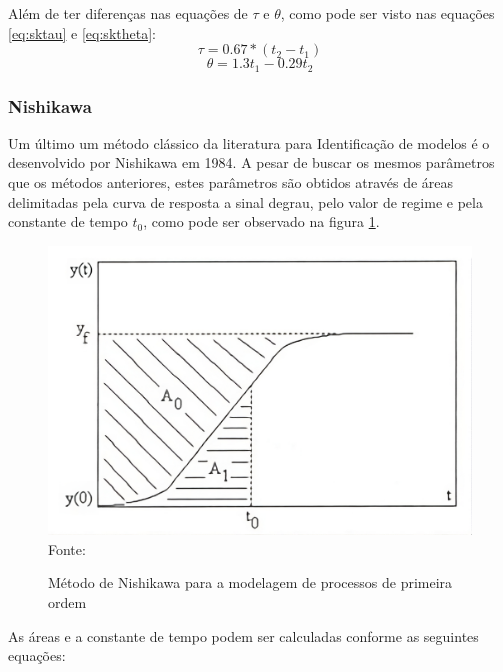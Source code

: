 Além de ter diferenças nas equações de $\tau$ e $\theta$, como pode ser visto nas equações \eqref{eq:sktau} e
\eqref{eq:sktheta}:
\begin{equation}
    \label{eq:sktau}
    \tau = 0.67*(t_2 - t_1)
\end{equation}
\begin{equation}
    \label{eq:sktheta}
    \theta = 1.3t_1 - 0.29t_2
\end{equation}

\subsubsection{Nishikawa}

Um último um método clássico da literatura para Identificação de modelos é o desenvolvido por Nishikawa em 1984.
A pesar de buscar os mesmos parâmetros que os métodos anteriores, estes parâmetros são obtidos através de áreas
delimitadas pela curva de resposta a sinal degrau, pelo valor de regime e pela constante de tempo $t_0$, como pode ser
observado na figura \ref{fig:ni_ident_meth}.


\begin{figure}[H]
    \centering
    \caption{Método de Nishikawa para a modelagem de processos de primeira ordem}
    \includegraphics[scale=0.3]{figuras/ni_ident_meth}
    \label{fig:ni_ident_meth}
    \\
    \vspace{0cm}\hspace{0cm}\small{Fonte: \cite{CoelhoIdentificacao}}
\end{figure}

As áreas e a constante de tempo podem ser calculadas conforme as seguintes equações:

